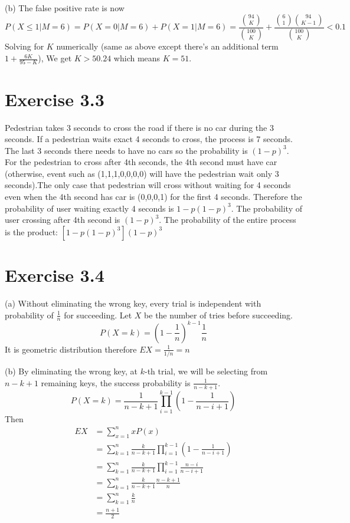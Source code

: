 \documentclass[12pt]{article}
\begin{document}
(b)
The false positive rate is now 
$$P(X\leq 1 | M = 6) = P(X=0|M=6) + P(X=1|M=6)=  \frac{{94 \choose K}}{{100 \choose K}} +  \frac{{6 \choose 1}{94 \choose K-1}}{{100 \choose K}} < 0.1 $$
Solving for $K$ numerically (same as above except there's an additional term $1 + \frac{6K}{95-K}$), We get $K > 50.24$ which means $K=51$.

\section*{Exercise 3.3}
Pedestrian takes 3 seconds to cross the road if there is no car during the 3 seconds. If a pedestrian waits exact 4 seconds to cross, the process is 7 seconds. The last 3 seconds there needs to have no cars so the probability is $(1-p)^3$. For the pedestrian to cross after 4th seconds, the 4th second must have car (otherwise, event such as (1,1,1,0,0,0,0) will have the pedestrian wait only 3 seconds).The only case that pedestrian will cross without waiting for 4 seconds even when the 4th second has car is (0,0,0,1) for the first 4 seconds. Therefore the probability of user waiting exactly 4 seconds is $1-p(1-p)^3$. The probability of user crossing after 4th second is $(1-p)^3$. The probability of the entire process is the product: $[1-p(1-p)^3](1-p)^3$

\section*{Exercise 3.4}
(a) Without eliminating the wrong key, every trial is independent with probability of $\frac{1}{n}$ for succeeding. Let $X$ be the number of tries before succeeding. 
$$P(X=k) = \left(1 - \frac{1}{n}\right)^{k-1} \frac{1}{n}$$
It is geometric distribution therefore $EX = \frac{1}{1/n} = n$

(b) By eliminating the wrong key, at $k$-th trial, we will be selecting from $n - k + 1$ remaining keys, the success probability is $\frac{1}{n-k+1}$. 
$$P(X=k) = \frac{1}{n-k+1} \prod^{k-1}_{i=1} \left(1- \frac{1}{n-i+1} \right)$$
Then
$$\begin{aligned}
EX &= \sum_{x=1}^{n} xP(x) \\
   &= \sum_{k=1}^{n} \frac{k}{n-k+1} \prod^{k-1}_{i=1} \left(1- \frac{1}{n-i+1} \right) \\
   &= \sum_{k=1}^{n} \frac{k}{n-k+1} \prod^{k-1}_{i=1} \frac{n -i}{n-i+1} \\
   &= \sum_{k=1}^{n} \frac{k}{n-k+1} \frac{n - k + 1}{n} \\
   &= \sum_{k=1}^{n} \frac{k}{n} \\
   &= \frac{n+1}{2}
\end{aligned}$$
\end{document}
